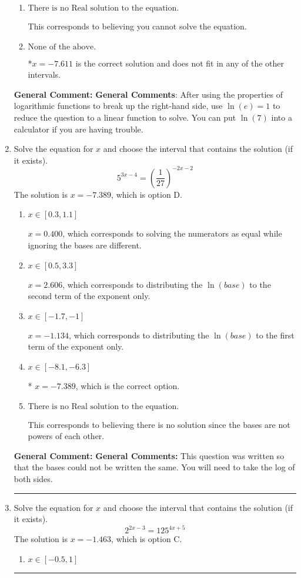 \documentclass{extbook}[14pt]
\newcommand{\litem}[1]{\item #1

\rule{\textwidth}{0.4pt}}
\begin{document}
\begin{enumerate}
{\begin{enumerate}[label=\Alph*.]
$x = 7.611$, which is the negative of the correct solution.
\item \( \text{There is no Real solution to the equation.} \)

This corresponds to believing you cannot solve the equation.
\item \( \text{None of the above.} \)

*$x = -7.611$ is the correct solution and does not fit in any of the other intervals.
\end{enumerate}

\textbf{General Comment:} \textbf{General Comments}: After using the properties of logarithmic functions to break up the right-hand side, use $\ln(e) = 1$ to reduce the question to a linear function to solve. You can put $\ln(7)$ into a calculator if you are having trouble.
}
\litem{
Solve the equation for $x$ and choose the interval that contains the solution (if it exists).
\[ 5^{3x-4} = \left(\frac{1}{27}\right)^{-2x-2} \]The solution is \( x = -7.389 \), which is option D.\begin{enumerate}[label=\Alph*.]
\item \( x \in [0.3, 1.1] \)

$x = 0.400$, which corresponds to solving the numerators as equal while ignoring the bases are different.
\item \( x \in [0.5, 3.3] \)

$x = 2.606$, which corresponds to distributing the $\ln(base)$ to the second term of the exponent only.
\item \( x \in [-1.7, -1] \)

$x = -1.134$, which corresponds to distributing the $\ln(base)$ to the first term of the exponent only.
\item \( x \in [-8.1, -6.3] \)

* $x = -7.389$, which is the correct option.
\item \( \text{There is no Real solution to the equation.} \)

This corresponds to believing there is no solution since the bases are not powers of each other.
\end{enumerate}

\textbf{General Comment:} \textbf{General Comments:} This question was written so that the bases could not be written the same. You will need to take the log of both sides.
}
\litem{
Solve the equation for $x$ and choose the interval that contains the solution (if it exists).
\[ 2^{2x-3} = 125^{4x+5} \]The solution is \( x = -1.463 \), which is option C.\begin{enumerate}[label=\Alph*.]
\item \( x \in [-0.5, 1] \)


\end{enumerate}}
\end{enumerate}
\end{document}
